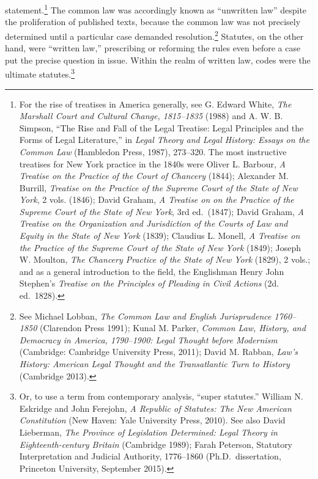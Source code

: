 \documentclass[12pt,]{article}
\let\rmarkdownfootnote\footnote%
\def\footnote{\protect\rmarkdownfootnote}
\begin{document}
statement.\footnote{For the rise of treatises in America generally, see
  G. Edward White, \emph{The Marshall Court and Cultural Change,
  1815--1835} (1988) and A. W. B. Simpson, ``The Rise and Fall of the
  Legal Treatise: Legal Principles and the Forms of Legal Literature,''
  in \emph{Legal Theory and Legal History: Essays on the Common Law}
  (Hambledon Press, 1987), 273--320. The most instructive treatises for
  New York practice in the 1840s were Oliver L. Barbour, \emph{A
  Treatise on the Practice of the Court of Chancery} (1844); Alexander
  M. Burrill, \emph{Treatise on the Practice of the Supreme Court of the
  State of New York}, 2 vols. (1846); David Graham, \emph{A Treatise on
  on the Practice of the Supreme Court of the State of New York}, 3rd
  ed.~(1847); David Graham, \emph{A Treatise on the Organization and
  Jurisdiction of the Courts of Law and Equity in the State of New York}
  (1839); Claudius L. Monell, \emph{A Treatise on the Practice of the
  Supreme Court of the State of New York} (1849); Joseph W. Moulton,
  \emph{The Chancery Practice of the State of New York} (1829), 2 vols.;
  and as a general introduction to the field, the Englishman Henry John
  Stephen's \emph{Treatise on the Principles of Pleading in Civil
  Actions} (2d. ed.~1828).} The common law was accordingly known as
``unwritten law'' despite the proliferation of published texts, because
the common law was not precisely determined until a particular case
demanded resolution.\footnote{See Michael Lobban, \emph{The Common Law
  and English Jurisprudence 1760--1850} (Clarendon Press 1991); Kunal M.
  Parker, \emph{Common Law, History, and Democracy in America,
  1790--1900: Legal Thought before Modernism} (Cambridge: Cambridge
  University Press, 2011); David M. Rabban, \emph{Law's History:
  American Legal Thought and the Transatlantic Turn to History}
  (Cambridge 2013).} Statutes, on the other hand, were ``written law,''
prescribing or reforming the rules even before a case put the precise
question in issue. Within the realm of written law, codes were the
ultimate statutes.\footnote{Or, to use a term from contemporary
  analysis, ``super statutes.'' William N. Eskridge and John Ferejohn,
  \emph{A Republic of Statutes: The New American Constitution} (New
  Haven: Yale University Press, 2010). See also David Lieberman,
  \emph{The Province of Legislation Determined: Legal Theory in
  Eighteenth-century Britain} (Cambridge 1989); Farah Peterson,
  Statutory Interpretation and Judicial Authority, 1776--1860
  (Ph.D.~dissertation, Princeton University, September 2015).}
\end{document}
